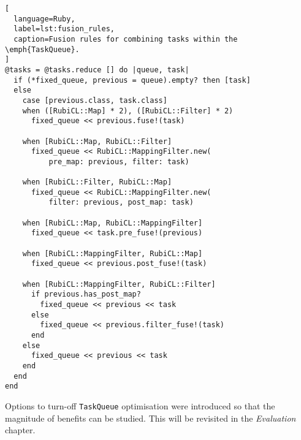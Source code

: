 \begin{lstlisting}[
  language=Ruby,
  label=lst:fusion_rules,
  caption=Fusion rules for combining tasks within the \emph{TaskQueue}.
]
@tasks = @tasks.reduce [] do |queue, task|
  if (*fixed_queue, previous = queue).empty? then [task]
  else
    case [previous.class, task.class]
    when ([RubiCL::Map] * 2), ([RubiCL::Filter] * 2)
      fixed_queue << previous.fuse!(task)

    when [RubiCL::Map, RubiCL::Filter]
      fixed_queue << RubiCL::MappingFilter.new(
          pre_map: previous, filter: task)

    when [RubiCL::Filter, RubiCL::Map]
      fixed_queue << RubiCL::MappingFilter.new(
          filter: previous, post_map: task)

    when [RubiCL::Map, RubiCL::MappingFilter]
      fixed_queue << task.pre_fuse!(previous)

    when [RubiCL::MappingFilter, RubiCL::Map]
      fixed_queue << previous.post_fuse!(task)

    when [RubiCL::MappingFilter, RubiCL::Filter]
      if previous.has_post_map?
        fixed_queue << previous << task
      else
        fixed_queue << previous.filter_fuse!(task)
      end
    else
      fixed_queue << previous << task
    end
  end
end
\end{lstlisting}

Options to turn-off \verb|TaskQueue| optimisation were introduced so that the magnitude of benefits can be studied. This will be revisited in the \emph{Evaluation} chapter.
